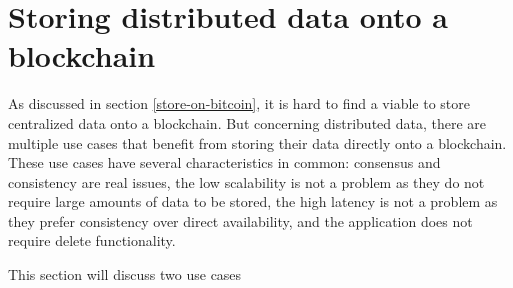 \section{Storing distributed data onto a blockchain}
\label{resource-allocation}

As discussed in section \ref{store-on-bitcoin}, it is hard to find a viable to store centralized data onto a blockchain. But concerning distributed data, there are multiple use cases that benefit from storing their data directly onto a blockchain. These use cases have several characteristics in common: consensus and consistency are real issues, the low scalability is not a problem as they do not require large amounts of data to be stored, the high latency is not a problem as they prefer consistency over direct availability, and the application does not require delete functionality. 

This section will discuss two use cases 